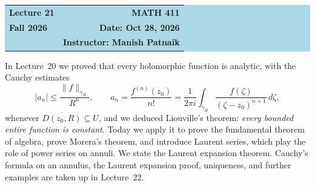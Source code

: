 \documentclass[11pt]{article}
\theoremstyle{plain}
\theoremstyle{definition}
\theoremstyle{boldremark}
\theoremstyle{remark}
\numberwithin{equation}{section}
\begin{document}
\begin{center}
  \colorbox{lightblue}{%
    \begin{minipage}{0.94\textwidth}
      \vspace{0.55em}
      \begin{tabular*}{\textwidth}{@{\extracolsep{\fill}}lr}
        {\color{courseblue}\bfseries\LARGE Lecture 21} &
        {\color{courseblue}\bfseries\LARGE MATH 411}\\[0.35em]
        \textbf{Fall 2026} & \textbf{Date: Oct 28, 2026}\\
        & \textbf{Instructor: Manish Patnaik}
      \end{tabular*}
      \vspace{0.45em}
    \end{minipage}}
\end{center}

\setcounter{tocdepth}{1}
\tableofcontents
\vspace{0.45em}

In Lecture~20 we proved that every holomorphic function is analytic,
with the Cauchy estimates
\[
 |a_n|\leq\frac{\|f\|_{\gamma_R}}{R^n},\qquad
 a_n=\frac{f^{(n)}(z_0)}{n!}=\frac{1}{2\pi i}\int_{\gamma_R}
 \frac{f(\zeta)}{(\zeta-z_0)^{n+1}}\,d\zeta,
\]
whenever $\overline{D(z_0,R)}\subseteq U$, and we deduced Liouville's
theorem: \emph{every bounded entire function is constant}. Today we apply
it to prove the fundamental theorem of algebra, prove Morera's theorem,
and introduce Laurent series, which play the role of power
series on annuli. We state the Laurent expansion theorem. Cauchy's
formula on an annulus, the Laurent expansion proof, uniqueness, and
further examples are taken up in Lecture~22.
\end{document}
